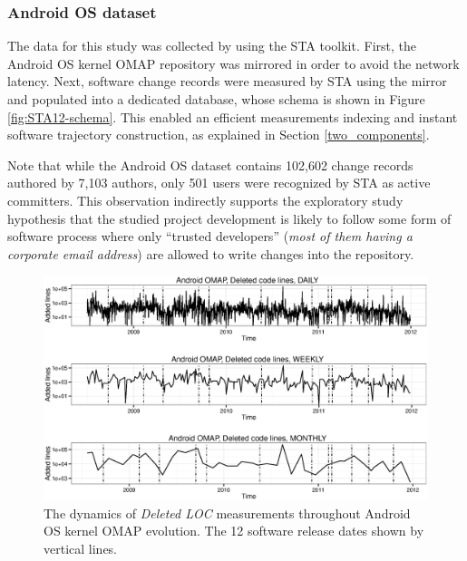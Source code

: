\subsubsection{Android OS dataset}
The data for this study was collected by using the STA toolkit. First, the Android OS kernel OMAP repository was mirrored in order to avoid the network latency. Next, software change records were measured by STA using the mirror and populated into a dedicated database, whose schema is shown in Figure \ref{fig:STA12-schema}. This enabled an efficient measurements indexing and instant software trajectory construction, as explained in Section \ref{two_components}.

Note that while the Android OS dataset contains 102,602 change records authored by 7,103 authors, only 501 users were recognized by STA as active committers. This observation indirectly supports the exploratory study hypothesis that the studied project development is likely to follow some form of software process where only ``trusted developers'' (\textit{most of them having a corporate email address}) are allowed to write changes into the repository.

\begin{figure}[t]
   \centering
   \includegraphics[width=145mm]{figures/omap_removed_lines_plot.eps}
   \caption[The dynamics of \textit{Deleted LOC} measurements throughout Android OS kernel OMAP evolution.]
   {The dynamics of \textit{Deleted LOC} measurements throughout Android OS kernel OMAP evolution. 
   The 12 software release dates shown by vertical lines.}
   \label{fig:OMAP_dynamics}
\end{figure}

